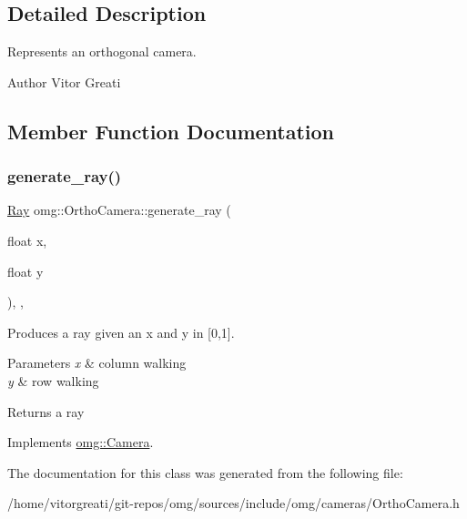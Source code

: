 \subsection{Detailed Description}
Represents an orthogonal camera. 

\begin{DoxyAuthor}{Author}
Vitor Greati 
\end{DoxyAuthor}


\subsection{Member Function Documentation}
\mbox{\label{classomg_1_1_ortho_camera_af5dba96ad9cdf91121093d0c9d72e57f}} 
\subsubsection{\texorpdfstring{generate\_ray()}{generate\_ray()}}
{\footnotesize\ttfamily \mbox{\hyperlink{classomg_1_1_ray}{Ray}} omg\+::\+Ortho\+Camera\+::generate\+\_\+ray (\begin{DoxyParamCaption}\item[{float}]{x,  }\item[{float}]{y }\end{DoxyParamCaption})\hspace{0.3cm}{\ttfamily [inline]}, {\ttfamily [override]}, {\ttfamily [virtual]}}



Produces a ray given an x and y in \mbox{[}0,1\mbox{]}. 


\begin{DoxyParams}{Parameters}
{\em x} & column walking \\
\hline
{\em y} & row walking \\
\hline
\end{DoxyParams}
\begin{DoxyReturn}{Returns}
a ray 
\end{DoxyReturn}


Implements \mbox{\hyperlink{classomg_1_1_camera_aca08c044082cb3573d606a8c851f52fe}{omg\+::\+Camera}}.



The documentation for this class was generated from the following file\+:\begin{DoxyCompactItemize}
\item 
/home/vitorgreati/git-\/repos/omg/sources/include/omg/cameras/Ortho\+Camera.\+h\end{DoxyCompactItemize}
